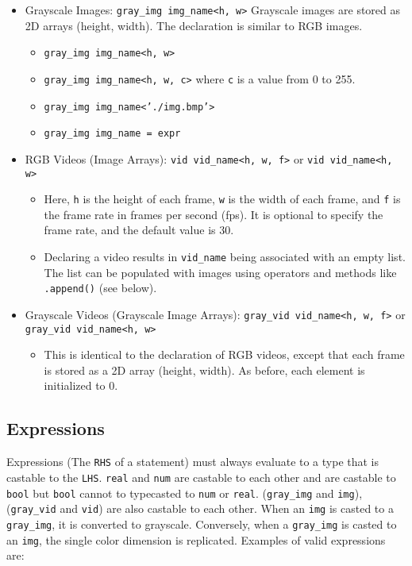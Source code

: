 \documentclass[a4paper, 11pt]{article}
\begin{document}
\begin{itemize}
        \item Grayscale Images: \texttt{gray\_img img\_name<h, w>}
            Grayscale images are stored as 2D arrays (height, width). The declaration is similar to RGB images.
            \begin{itemize}
              \item \texttt{gray\_img img\_name<h, w>}
              \item \texttt{gray\_img img\_name<h, w, c>} where \texttt{c} is a value from 0 to 255.
              \item \texttt{gray\_img img\_name<'./img.bmp'>}
              \item \texttt{gray\_img img\_name = expr}
            \end{itemize}


        \item RGB Videos (Image Arrays): \texttt{vid vid\_name<h, w, f>} or \texttt{vid vid\_name<h, w>}
            \begin{itemize}
              \item Here, \texttt{h} is the height of each frame, \texttt{w} is the width of each frame, and \texttt{f} is the frame rate in frames per second (fps). It is optional to specify the frame rate, and the default value is $30$.
              \item Declaring a video results in \texttt{vid\_name} being associated with an empty list. The list can be populated with images using operators and methods like \texttt{.append()} (see below).
            \end{itemize}

        \item Grayscale Videos (Grayscale Image Arrays): \texttt{gray\_vid vid\_name<h, w, f>} or \texttt{gray\_vid vid\_name<h, w>}
            \begin{itemize}
              \item This is identical to the declaration of RGB videos, except that each frame is stored as a 2D array (height, width). As before, each element is initialized to 0.
            \end{itemize}
            
      \end{itemize}


    \subsection{Expressions}
    
    Expressions (The \texttt{RHS} of a statement) must always evaluate to a type that is castable to the \texttt{LHS}. \texttt{real} and \texttt{num} are castable to each other and are castable to \texttt{bool} but \texttt{bool} cannot to typecasted to \texttt{num} or \texttt{real}. (\texttt{gray\_img} and \texttt{img}), (\texttt{gray\_vid} and \texttt{vid}) are also castable to each other. When an \texttt{img} is casted to a \texttt{gray\_img}, it is converted to grayscale. Conversely, when a \texttt{gray\_img} is casted to an \texttt{img}, the single color dimension is replicated. Examples of valid expressions are:
    
\end{document}
